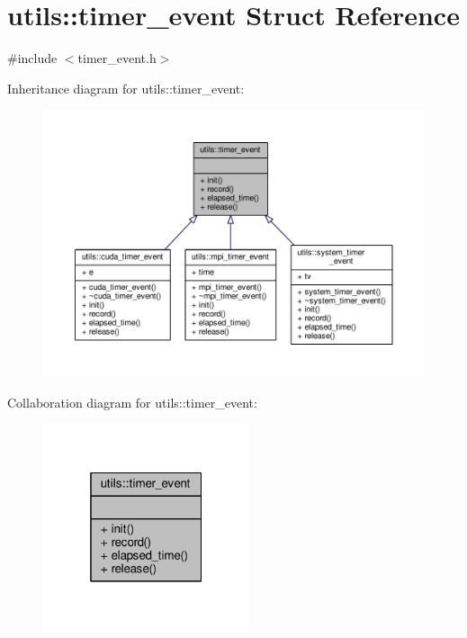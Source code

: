 \hypertarget{structutils_1_1timer__event}{\section{utils\-:\-:timer\-\_\-event Struct Reference}
\label{structutils_1_1timer__event}
}


{\ttfamily \#include $<$timer\-\_\-event.\-h$>$}



Inheritance diagram for utils\-:\-:timer\-\_\-event\-:\nopagebreak
\begin{figure}[H]
\begin{center}
\leavevmode
\includegraphics[width=350pt]{structutils_1_1timer__event__inherit__graph}
\end{center}
\end{figure}


Collaboration diagram for utils\-:\-:timer\-\_\-event\-:\nopagebreak
\begin{figure}[H]
\begin{center}
\leavevmode
\includegraphics[width=172pt]{structutils_1_1timer__event__coll__graph}
\end{center}
\end{figure}
